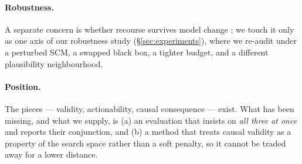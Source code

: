 \paragraph{Robustness.} A separate concern is whether recourse survives model
change \citep{upadhyay2021robust}; we touch it only as one axis of our robustness
study (\S\ref{sec:experiments}), where we re-audit \cac{} under a perturbed SCM, a
swapped black box, a tighter budget, and a different plausibility neighbourhood.

\paragraph{Position.} The pieces --- validity, actionability, causal consequence
--- exist. What has been missing, and what we supply, is (a) an evaluation that
insists on \emph{all three at once} and reports their conjunction, and (b) a
method that treats causal validity as a property of the search space rather than a
soft penalty, so it cannot be traded away for a lower distance.
